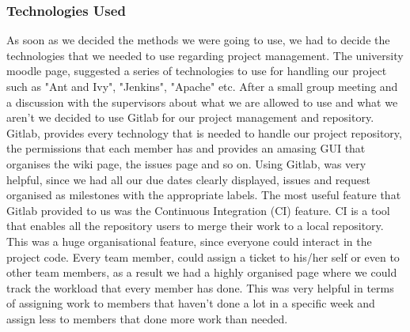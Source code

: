 \documentclass{l3proj}
\begin{document}
\subsubsection{Technologies Used}
\label{tech}

As soon as we decided the methods we were going to use, we had to decide the technologies that we needed to use regarding project management. The university moodle page, suggested a series of technologies to use for handling our project such as "Ant and Ivy", "Jenkins", "Apache" etc. After a small group meeting and a discussion with the supervisors about what we are allowed to use and what we aren't we decided to use Gitlab for our project management and repository. Gitlab, provides every technology that is needed to handle our project repository, the permissions that each member has and provides an amasing GUI that organises the wiki page, the issues page and so on. Using Gitlab, was very helpful, since we had all our due dates clearly displayed, issues and request organised as milestones with the appropriate labels. The most useful feature that Gitlab provided to us was the Continuous Integration (CI) feature. CI is a tool that enables all the repository users to merge their work to a local repository. This was a huge organisational feature, since everyone could interact in the project code. Every team member, could assign a ticket to his/her self or even to other team members, as a result we had a highly organised page where we could track the workload that every member has done. This was very helpful in terms of assigning work to members that haven't done a lot in a specific week and assign less to members that done more work than needed.
\end{document}
